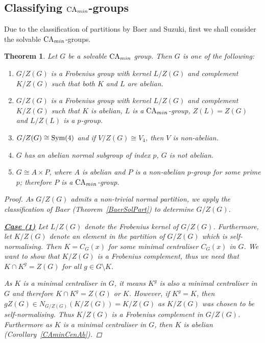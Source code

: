 \documentclass[a4paper,11pt]{article}
\theoremstyle{plain}
\newtheorem{thm}{Theorem}[section]
\numberwithin{thm}{section}
\begin{document}
\subsection{Classifying ${\rm CA}_{min}$-groups}

Due to the classification of partitions by Baer and Suzuki, first we shall consider the solvable ${\rm CA}_{min}$-groups.

\begin{thm}\label{SolCAminGp}
Let $G$ be a solvable ${\rm CA}_{min}$ group.
Then $G$ is one of the following:
\begin{enumerate}
\item $G/Z(G)$ is a Frobenius group with kernel $L/Z(G)$ and complement $K/Z(G)$ such that both $K$ and $L$ are abelian.
\item $G/Z(G)$ is a Frobenius group with kernel $L/Z(G)$ and complement $K/Z(G)$ such that $K$ is abelian, $L$ is a ${\rm CA}_{min}$-group, $Z(L)=Z(G)$ and $L/Z(L)$ is a $p$-group.
\item $G/Z(G)\cong {\rm Sym}(4)$ and if $V/Z(G)\cong V_4$, then $V$ is non-abelian. 
\item $G$ has an abelian normal subgroup of index $p$, $G$ is not abelian.
\item $G\cong A\times P$, where $A$ is abelian and $P$ is a non-abelian $p$-group for some prime $p$; therefore $P$ is a ${\rm CA}_{min}$-group.
\end{enumerate}

\begin{proof}
As $G/Z(G)$ admits a non-trivial normal partition, we apply the classification of Baer (Theorem~\ref{BaerSolPart}) to determine $G/Z(G)$.

\underline{\bf Case (1)}\newline
Let $L/Z(G)$ denote the Frobenius kernel of $G/Z(G)$.
Furthermore, let $K/Z(G)$ denote an element in the partition of $G/Z(G)$ which is self-normalising.
Then $K=C_G(x)$ for some minimal centraliser $C_G(x)$ in $G$.
We want to show that $K/Z(G)$ is a Frobenius complement, thus we need that $K\cap K^g=Z(G)$ for all $g\in G\setminus K$.

As $K$ is a minimal centraliser in $G$, it means  $K^g$ is also a minimal centraliser in $G$ and therefore $K\cap K^g=Z(G)$ or $K$.
However, if $K^g=K$, then $gZ(G)\in N_{G/Z(G)}(K/Z(G))=K/Z(G)$ as $K/Z(G)$ was chosen to be self-normalising.
Thus $K/Z(G)$ is a Frobenius complement in $G/Z(G)$.
Furthermore as $K$ is a minimal centraliser in $G$, then $K$ is abelian (Corollary~\ref{CAminCenAb}).


\end{proof}
\end{thm}
\end{document}
